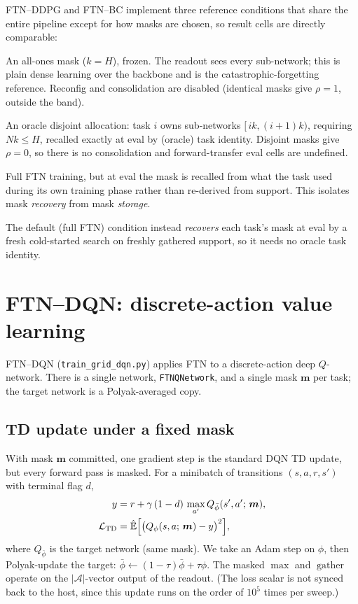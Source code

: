 \documentclass[11pt]{article}
\newcommand{\Ehat}{\hat{\mathbb{E}}}
\newcommand{\obs}{s}
\newcommand{\act}{a}
\newcommand{\mask}{\bm{m}}                 %
\newcommand{\Ho}{H}                        %
\newcommand{\kk}{k}                        %
\newcommand{\code}[1]{\texttt{\small #1}}
\begin{document}
FTN--DDPG and FTN--BC implement three reference conditions that share the entire
pipeline except for how masks are chosen, so result cells are directly
comparable:
\begin{description}[leftmargin=1.5em,itemsep=1pt]
  \item[\code{no\_mask}] An all-ones mask ($\kk=\Ho$), frozen. The readout sees
  every sub-network; this is plain dense learning over the backbone and is the
  catastrophic-forgetting reference. Reconfig and consolidation are disabled
  (identical masks give $\rho=1$, outside the band).
  \item[\code{fixed\_mask}] An oracle disjoint allocation: task $i$ owns
  sub-networks $[\,i\kk,(i{+}1)\kk)$, requiring $N\kk\le\Ho$, recalled exactly at
  eval by (oracle) task identity. Disjoint masks give $\rho=0$, so there is no
  consolidation and forward-transfer eval cells are undefined.
  \item[\code{stored\_mask}] Full FTN training, but at eval the mask is recalled
  from what the task used during its own training phase rather than re-derived
  from support. This isolates mask \emph{recovery} from mask \emph{storage}.
\end{description}
The default (full FTN) condition instead \emph{recovers} each task's mask at eval
by a fresh cold-started search on freshly gathered support, so it needs no oracle
task identity.

\section{FTN--DQN: discrete-action value learning}
\label{sec:dqn}

FTN--DQN (\code{train\_grid\_dqn.py}) applies FTN to a discrete-action deep
$Q$-network. There is a single network, \code{FTNQNetwork}, and a single mask
$\mask$ per task; the target network is a Polyak-averaged copy.

\subsection{TD update under a fixed mask}

With mask $\mask$ committed, one gradient step is the standard DQN TD update, but
every forward pass is masked. For a minibatch of transitions $(\obs,\act,r,\obs')$
with terminal flag $d$,
\begin{align}
y &= r + \gamma\,(1-d)\,\max_{\act'} Q_{\bar\phi}(\obs',\act';\,\mask),\\
\mathcal L_{\mathrm{TD}} &= \Ehat\Bigl[\bigl(Q_\phi(\obs,\act;\,\mask) - y\bigr)^2\Bigr],
\end{align}
where $Q_{\bar\phi}$ is the target network (same mask). We take an Adam step on
$\phi$, then Polyak-update the target: $\bar\phi \gets (1-\tau)\bar\phi +
\tau\phi$. The masked $\max$ and $\operatorname{gather}$ operate on the
$|\mathcal A|$-vector output of the readout. (The loss scalar is not synced back
to the host, since this update runs on the order of $10^5$ times per sweep.)
\end{document}

